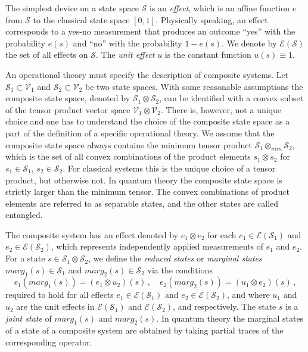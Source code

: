 \documentclass[12pt]{iopart}
\theoremstyle{definition}
\begin{document}
The simplest device on a state space $\mathcal{S}$ is an \emph{effect}, which is an affine function $e$ from $\mathcal{S}$ to the classical state space $[0,1]$. Physically speaking, an effect corresponds to a yes-no measurement that produces an outcome ``yes'' with the probability $e(s)$ and ``no'' with the probability $1-e(s)$. We denote by $\mathcal{E}(\mathcal{S})$ the set of all effects on $\mathcal{S}$. The \emph{unit effect} $u$ is the constant function $u(s)\equiv 1$.

An operational theory must specify the description of composite systems. 
Let $\mathcal{S}_1 \subset \mathcal{V}_1$ and $\mathcal{S}_2 \subset \mathcal{V}_2$ be two state spaces. 
With some reasonable assumptions the composite state space, denoted by $\mathcal{S}_1  \otimes \mathcal{S}_2$, 
can be identified with a convex subset of the tensor product vector space  $\mathcal{V}_1\otimes \mathcal{V}_2$. 
There is, however, not a unique choice \cite{NaPh69} and one has to understand the choice of the composite state space as a part of the definition of a specific operational theory.
We assume that the composite state space always contains the minimum tensor product $\mathcal{S}_1 \otimes_{min} \mathcal{S}_2$, which is the set of all convex combinations of the product elements $s_1\otimes s_2$ 
for $s_1\in\mathcal{S}_1$, $s_2\in\mathcal{S}_2$.
For classical systems this is the unique choice of a tensor product, but otherwise not.  
In quantum theory the composite state space is strictly larger than the minimum tensor. 
The convex combinations of product elements are referred to as separable states, and the other states are called entangled. 


The composite system has an effect denoted by $e_1 \otimes e_2$ 
for each $e_1 \in \mathcal{E}(\mathcal{S}_1)$ and 
$e_2\in \mathcal{E}(\mathcal{S}_2)$, which represents independently applied measurements of 
$e_1$ and $e_2$. 
For a state $s\in\mathcal{S}_1  \otimes \mathcal{S}_2$, we define the \emph{reduced states} or \emph{marginal states} $marg_1(s)\in\mathcal{S}_1$ and $marg_2(s)\in\mathcal{S}_2$ via the conditions
\begin{equation}
e_1( marg_1(s)) = (e_1 \otimes u_2)(s) \, , \quad e_2(marg_2(s)) = (u_1 \otimes e_2)(s) \, ,
\end{equation}
required to hold for all effects $e_1\in \mathcal{E}(\mathcal{S}_1)$ and $e_2\in\mathcal{E}(\mathcal{S}_2)$, and where $u_1$ and $u_2$ are the unit effects in $\mathcal{E}(\mathcal{S}_1)$ and $\mathcal{E}(\mathcal{S}_2)$, and respectively.
The state $s$ is a \emph{joint state} of $marg_1(s)$ and $marg_2(s)$.
In quantum theory the marginal states of a state of a composite system are obtained by taking partial traces of the corresponding operator. 
\end{document}
